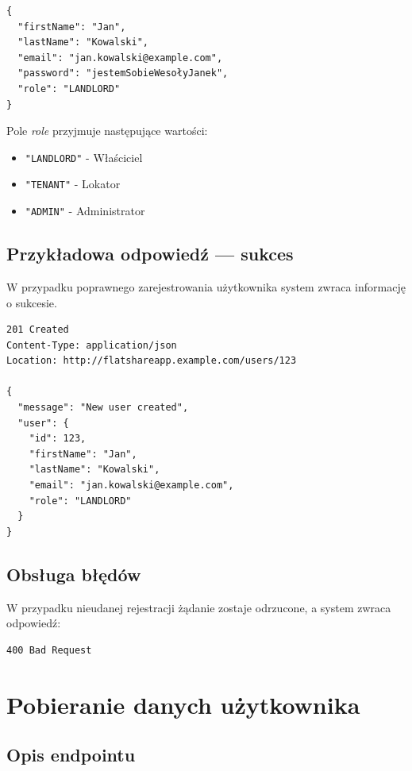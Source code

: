 \documentclass[11pt, a4paper]{article}
\begin{document}
\begin{lstlisting}[style=json,caption={Ciało żądania rejestracji}]
{
  "firstName": "Jan",
  "lastName": "Kowalski",
  "email": "jan.kowalski@example.com",
  "password": "jestemSobieWesołyJanek",
  "role": "LANDLORD"
}
\end{lstlisting}

Pole \textit{role} przyjmuje następujące wartości:
\begin{itemize}
  \item \texttt{"LANDLORD"} - Właściciel
  \item \texttt{"TENANT"} - Lokator
  \item \texttt{"ADMIN"} - Administrator
\end{itemize}

\subsection{Przykładowa odpowiedź — sukces}

W przypadku poprawnego zarejestrowania użytkownika system zwraca informację o sukcesie. 

\begin{lstlisting}[style=http,caption={Odpowiedź HTTP — sukces}]
201 Created
Content-Type: application/json
Location: http://flatshareapp.example.com/users/123

{
  "message": "New user created",
  "user": {
    "id": 123,
    "firstName": "Jan",
    "lastName": "Kowalski",
    "email": "jan.kowalski@example.com",
    "role": "LANDLORD"
  }
}
\end{lstlisting}

\subsection{Obsługa błędów}

W przypadku nieudanej rejestracji żądanie zostaje odrzucone, a system zwraca odpowiedź:

\begin{lstlisting}[style=http,caption={Odpowiedź HTTP — nieudana rejestracja}]
400 Bad Request
\end{lstlisting}

\section{Pobieranie danych użytkownika}

\subsection{Opis endpointu}
\end{document}
